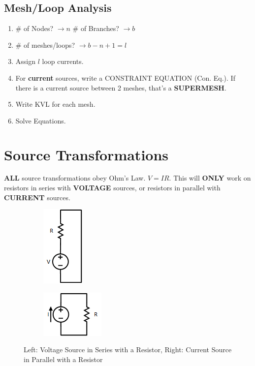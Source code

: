 \documentclass[10pt,letterpaper,final,twoside,notitlepage]{article}
\begin{document}
	\subsection*{Mesh/Loop Analysis}
		\begin{enumerate}
			\item \# of Nodes? $\rightarrow n$ \# of Branches? $\rightarrow b$
			\item \# of meshes/loops? $\rightarrow b-n+1 = l$
			\item Assign $l$ loop currents.
			\item For \textbf{current} sources, write a CONSTRAINT EQUATION (Con. Eq.). If there is a current source between 2 meshes, that's a \textbf{SUPERMESH}.
			\item Write KVL for each mesh.
			\item Solve Equations.
		\end{enumerate}

\section*{Source Transformations}
	\textbf{ALL} source transformations obey Ohm's Law. $V=IR$.
	This will \textbf{ONLY} work on resistors in series with \textbf{VOLTAGE} sources, or resistors in parallel with \textbf{CURRENT} sources.
	\begin{figure}[!htpb]
		\hspace{15mm}
		\begin{subfigure}
			\centering
			\includegraphics[scale=.4]{SeriesVoltageResistor.png}
			\label{fig:SeriesVoltageSource}
		\end{subfigure}
		\hspace{65mm}
		\begin{subfigure}
			\centering
			\includegraphics[scale=.4]{ParallelCurrentResistor.png}
			\label{fig:ParallelCurrentSource}
		\end{subfigure}
		\caption{Left: Voltage Source in Series with a Resistor, Right: Current Source in Parallel with a Resistor}
	\end{figure}
\newpage
\end{document}
